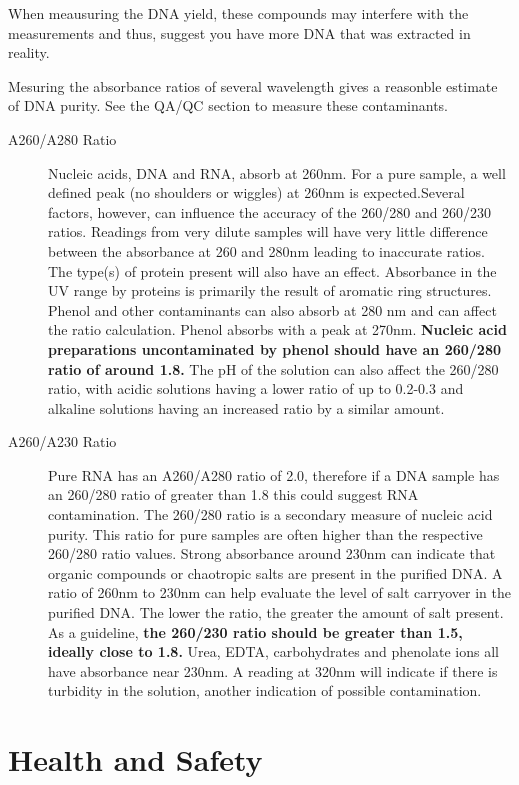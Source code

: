 \documentclass[12pt]{SOP5_beta}\usepackage[]{graphicx}\usepackage[]{xcolor}
\begin{document}
\NP When meausuring the DNA yield, these compounds may interfere with the measurements and thus, suggest you have more DNA that was extracted in reality. 

\NP Mesuring the absorbance ratios of several wavelength gives a reasonble estimate of DNA purity. See the QA/QC section to measure these contaminants.

\begin{description}
  \item[A260/A280 Ratio] Nucleic acids, DNA and RNA, absorb at 260nm. For a pure sample, a well defined peak (no shoulders or wiggles) at 260nm is expected.Several factors, however, can influence the accuracy of the 260/280 and 260/230 ratios. Readings from very dilute samples will have very little difference between the absorbance at 260 and 280nm leading to inaccurate ratios.  The type(s) of protein present will also have an effect.  Absorbance in the UV range by proteins is primarily the result of aromatic ring structures. Phenol and other contaminants can also absorb at 280 nm and can affect the ratio calculation. Phenol absorbs with a peak at 270nm. \textbf{Nucleic acid preparations uncontaminated by phenol should have an 260/280 ratio of around 1.8. } The pH of the solution can also affect the 260/280 ratio, with acidic solutions having a lower ratio of up to 0.2-0.3 and alkaline solutions having an increased ratio by a similar amount.
  \item[A260/A230 Ratio] Pure RNA has an A260/A280 ratio of 2.0, therefore if a DNA sample has an 260/280 ratio of greater than 1.8 this could suggest RNA contamination. The 260/280 ratio is a secondary measure of nucleic acid purity. This ratio for pure samples are often higher than the respective 260/280 ratio values. Strong absorbance around 230nm can indicate that organic compounds or chaotropic salts are present in the purified DNA.  A ratio of 260nm to 230nm can help evaluate the level of salt carryover in the purified DNA. The lower the ratio, the greater the amount of salt present. As a guideline, \textbf{the 260/230 ratio should be greater than 1.5, ideally close to 1.8.} Urea, EDTA, carbohydrates and phenolate ions all have absorbance near 230nm. A reading at 320nm will indicate if there is turbidity in the solution, another indication of possible contamination.  

\end{description}


\section{Health and Safety}
\end{document}
